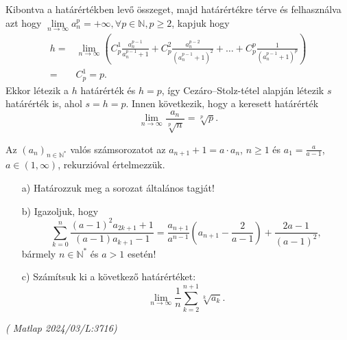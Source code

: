 \begin{solution}
Kibontva a határértékben levő összeget, majd határértékre térve és
felhasználva azt hogy $\lim\limits_{n\to\infty}{a_{n}^{p}}=+\infty,\forall p\in\mathbb{N},p\geq2$,
kapjuk hogy 
\[
\begin{aligned}h= & \lim_{n\rightarrow\infty}\left(C_{p}^{1}\frac{a_{n}^{p-1}}{a_{n}^{p-1}+1}+C_{p}^{2}\frac{a_{n}^{p-2}}{\left(a_{n}^{p-1}+1\right)^{2}}+\ldots+C_{p}^{p}\frac{1}{\left(a_{n}^{p-1}+1\right)^{p}}\right)\\
= & C_{p}^{1}=p.
\end{aligned}
\]
Ekkor létezik a $h$ határérték és $h=p$, így Cezáro--Stolz-tétel
alapján létezik $s$ határérték is, ahol $s=h=p.$ Innen következik,
hogy a keresett határérték 
\[
\lim_{n\rightarrow\infty}\frac{a_{n}}{\sqrt[p]{n}}=\sqrt[p]{p}.
\]
\end{solution}
\begin{extraproblem}
Az $(a_{n})_{n\in\mathbb{N}^{*}}$ valós számsorozatot az $a_{n+1}+1=a\cdot a_{n}$,
$n\geq1$ és $a_{1}=\frac{a}{a-1}$, $a\in(1,\infty)$, rekurzióval
értelmezzük. 
\begin{enumerate}
\item[a)] Határozzuk meg a sorozat általános tagját! 
\item[b)] Igazoljuk, hogy 
\[
{\sum}_{k=0}^{n}\frac{(a-1)^{2}a_{2k+1}+1}{(a-1)a_{k+1}-1}=\frac{a_{n+1}}{a^{n-1}}\left(a_{n+1}-\frac{2}{a-1}\right)+\frac{2a-1}{(a-1)^{2}},
\]
bármely $n\in\mathbb{N}^{*}$ és $a>1$ esetén! 
\item[c)] Számítsuk ki a következő határértéket: 
\[
\lim_{n\to\infty}\frac{1}{n}\sum_{k=2}^{n+1}\sqrt[k]{a_{k}}.
\]
\end{enumerate}
\begin{flushright}
\textit{( Matlap 2024/03/L:3716)} 
\par\end{flushright}
\end{extraproblem}

